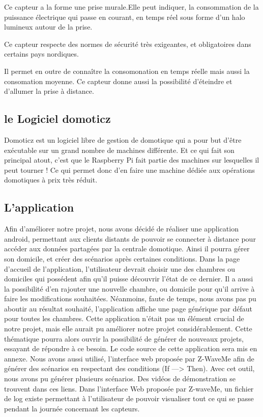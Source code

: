 \begin{description}
Ce capteur a la forme une prise murale.Elle peut indiquer, la consommation de la puissance électrique qui passe en courant, en temps réel sous forme d'un halo lumineux autour de la prise.

Ce capteur respecte des normes de sécurité très exigeantes, et obligatoires dans certains pays nordiques.

Il permet en outre de connaître la consomonation en temps réelle mais aussi la consomation moyenne. Ce capteur donne aussi la possibilité d'éteindre et d'allumer la prise à distance.

\end{description}



\subsection{le Logiciel domoticz}
Domoticz est un logiciel libre de gestion de domotique qui a pour but d’être exécutable sur un grand nombre de machines différente. Et ce qui fait son principal atout, c’est que le Raspberry Pi fait partie des machines sur lesquelles il peut tourner ! Ce qui permet donc d’en faire une machine dédiée aux opérations domotiques à prix très réduit. 

\subsection*{L'application}
Afin d'améliorer notre projet, nous avons décidé de réaliser une application android, permettant aux clients distants de pouvoir se connecter à distance pour accéder aux données partagées par la centrale domotique. Ainsi il pourra gérer son domicile, et créer des scénarios après certaines conditions. Dans la page d'accueil de l'application, l'utilisateur devrait choisir une des chambres ou domiciles qui possédent afin qu'il puisse découvrir l'état de ce dernier. Il a aussi la possibilité d'en rajouter une nouvelle chambre, ou domicile pour qu'il arrive à faire les modifications souhaitées.\newline
Néanmoins, faute de temps, nous avons pas pu aboutir au résultat souhaité, l'application affiche une page générique par défaut pour toutes les chambres. Cette application n'était pas un élément crucial de notre projet, mais elle aurait pu améliorer notre projet considérablement. Cette thématique pourra alors ouvrir la possibilité de générer de nouveaux projets, essayant de répondre à ce besoin.\newline
Le code source de cette application sera mis en annexe.\newline
Nous avons aussi utilisé, l'interface web proposée par Z-WaveMe afin de générer des scénarios en respectant des conditions (If ---> Then). Avec cet outil, nous avons pu générer plusieurs scénarios. Des vidéos de démonstration se trouvent dans ces liens.\newline
Dans l'interface Web proposée par Z-waveMe, un fichier de log existe permettant à l'utilisateur de pouvoir visualiser tout ce qui se passe pendant la journée concernant les capteurs.


